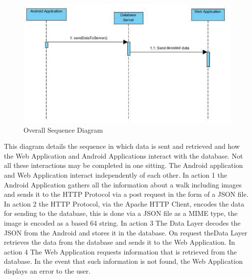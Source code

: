 \documentclass[12pt]{article}
\begin{document}
\begin{figure}[htp]
\begin{adjustwidth}{-2cm}{0cm}
\centering
\includegraphics[scale=0.80]{Design/sequence_diagram.jpg}
\caption{Overall Sequence Diagram}
\label{Overall Sequence Diagram}
\end{adjustwidth}
\end{figure}
This diagram details the sequence in which data is sent and retrieved and how the Web Application and Android Applications interact with the database. Not all these interactions may be completed in one sitting. The Android application and Web Application interact independently of each other. In action 1 the Android Application gathers all the information about a walk including images and sends it to the HTTP Protocol via a post request in the form of a JSON file. In action 2 the HTTP Protocol, via the Apache HTTP Client, encodes the data for sending to the database, this is done via a JSON file as a MIME type, the image is encoded as a based 64 string. In action 3 The Data Layer decodes the JSON from the Android and stores it in the database. On request theData Layer retrieves the data from the database and sends it to the Web Application. In action 4 The Web Application requests information that is retrieved from the database. In the event that such information is not found, the Web Application displays an error to the user.
\end{document}
